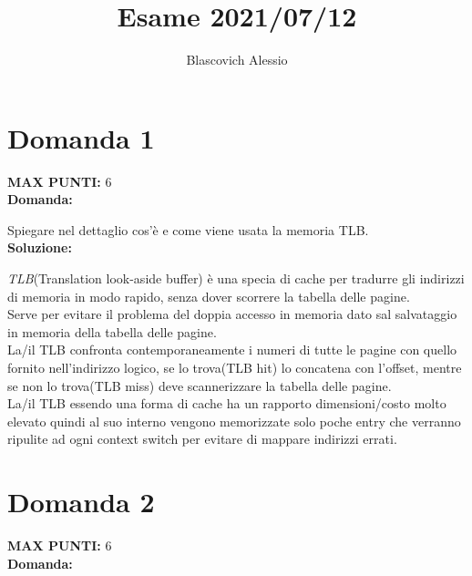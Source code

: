 \documentclass{article}
\title{Esame 2021/07/12}
\author{Blascovich Alessio}
\date{}
\begin{document}
    \maketitle
    \section*{Domanda 1}
    \textbf{MAX PUNTI:} 6\\
    \textbf{Domanda:}


    Spiegare nel dettaglio cos'è e come viene usata la memoria TLB.\\
    \textbf{Soluzione:}


    \emph{TLB}(Translation look-aside buffer) è una specia di cache per tradurre gli indirizzi di memoria in modo rapido, senza dover scorrere la tabella delle pagine.\\
    Serve per evitare il problema del doppia accesso in memoria dato sal salvataggio in memoria della tabella delle pagine.\\
    La/il TLB confronta contemporaneamente i numeri di tutte le pagine con quello fornito nell'indirizzo logico, se lo trova(TLB hit) lo concatena con l'offset, mentre se non lo trova(TLB miss) deve scannerizzare la tabella delle pagine.\\
    La/il TLB essendo una forma di cache ha un rapporto dimensioni/costo molto elevato quindi al suo interno vengono memorizzate solo poche entry che verranno ripulite ad ogni context switch per evitare di mappare indirizzi errati.
    \section*{Domanda 2}
    \textbf{MAX PUNTI:} 6\\
    \textbf{Domanda:}
\end{document}
